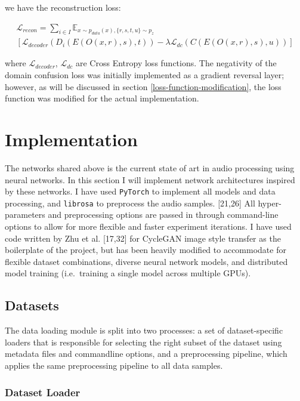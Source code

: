 \documentclass[12pt,a4paper,]{report}
\begin{document}
we have the reconstruction loss:

\begin{multline}
    \mathcal{L}_{recon} = \sum_{i \in I} \mathbb{E}_{x \sim p_{data}(x), \{r, s, t, u\} \sim p_{z}} \\
    [\mathcal{L}_{decoder}(D_i(E(O(x, r), s), t))  - \lambda \mathcal{L}_{dc}(C(E(O(x, r), s), u))] \label{eq:umtn}
\end{multline}

where \(\mathcal{L}_{decoder}\), \(\mathcal{L}_{dc}\) are Cross Entropy
loss functions. The negativity of the domain confusion loss was
initially implemented as a gradient reversal layer; however, as will be
discussed in section \ref{loss-function-modification}, the loss function
was modified for the actual implementation.

\hypertarget{implementation}{%
\chapter{Implementation}\label{implementation}}

The networks shared above is the current state of art in audio
processing using neural networks. In this section I will implement
network architectures inspired by these networks. I have used
\texttt{PyTorch} to implement all models and data processing, and
\texttt{librosa} to preprocess the audio samples. {[}21,26{]} All
hyper-parameters and preprocessing options are passed in through
command-line options to allow for more flexible and faster experiment
iterations. I have used code written by Zhu et al. {[}17,32{]} for
CycleGAN image style transfer as the boilerplate of the project, but has
been heavily modified to accommodate for flexible dataset combinations,
diverse neural network models, and distributed model training
(i.e.~training a single model across multiple GPUs).

\hypertarget{datasets}{%
\section{Datasets}\label{datasets}}

The data loading module is split into two processes: a set of
dataset-specific loaders that is responsible for selecting the right
subset of the dataset using metadata files and commandline options, and
a preprocessing pipeline, which applies the same preprocessing pipeline
to all data samples.

\hypertarget{dataset-loader}{%
\subsection{Dataset Loader}\label{dataset-loader}}
\end{document}
